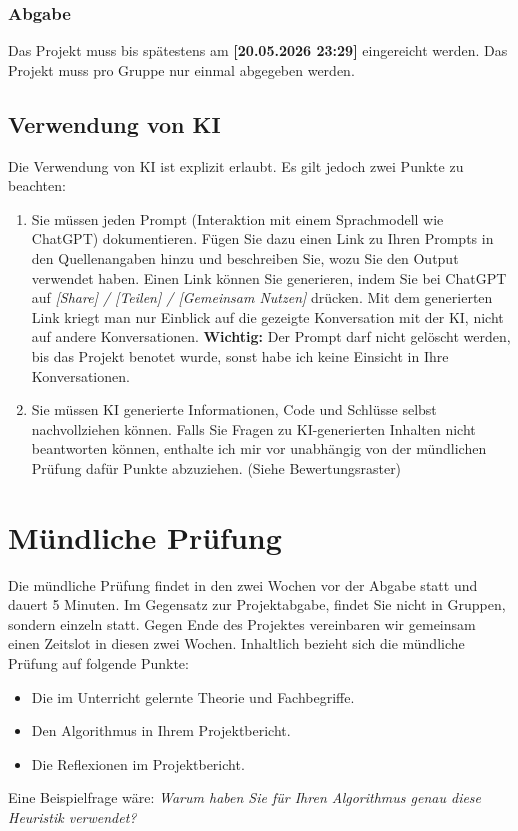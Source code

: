 \documentclass[12pt, a4]{article}
\begin{document}
\subsubsection*{Abgabe}
Das Projekt muss bis spätestens am \textbf{[20.05.2026 23:29]} eingereicht werden.
Das Projekt muss pro Gruppe nur einmal abgegeben werden.

\subsection*{Verwendung von KI}
Die Verwendung von KI ist explizit erlaubt. 
Es gilt jedoch zwei Punkte zu beachten: 

\begin{enumerate}
    \item Sie müssen jeden Prompt (Interaktion mit einem Sprachmodell wie ChatGPT) dokumentieren.
    Fügen Sie dazu einen Link zu Ihren Prompts in den Quellenangaben hinzu und beschreiben Sie, wozu Sie den Output verwendet haben.
    Einen Link können Sie generieren, indem Sie bei ChatGPT auf \textit{[Share] / [Teilen] / [Gemeinsam Nutzen]} drücken.
    Mit dem generierten Link kriegt man nur Einblick auf die gezeigte Konversation mit der KI, nicht auf andere Konversationen.
    \textbf{Wichtig:} Der Prompt darf nicht gelöscht werden, bis das Projekt benotet wurde, sonst habe ich keine Einsicht in Ihre Konversationen.
    \item Sie müssen KI generierte Informationen, Code und Schlüsse selbst nachvollziehen können.
    Falls Sie Fragen zu KI-generierten Inhalten nicht beantworten können, enthalte ich mir vor unabhängig von der mündlichen Prüfung dafür Punkte abzuziehen. (Siehe Bewertungsraster)
\end{enumerate}


\section{Mündliche Prüfung}
Die mündliche Prüfung findet in den zwei Wochen vor der Abgabe statt und dauert 5 Minuten.
Im Gegensatz zur Projektabgabe, findet Sie nicht in Gruppen, sondern einzeln statt.
Gegen Ende des Projektes vereinbaren wir gemeinsam einen Zeitslot in diesen zwei Wochen.
Inhaltlich bezieht sich die mündliche Prüfung auf folgende Punkte:
\begin{itemize}
    \item Die im Unterricht gelernte Theorie und Fachbegriffe.
    \item Den Algorithmus in Ihrem Projektbericht.
    \item Die Reflexionen im Projektbericht.
\end{itemize} 
Eine Beispielfrage wäre: \textit{Warum haben Sie für Ihren Algorithmus genau diese Heuristik verwendet?}
\end{document}
